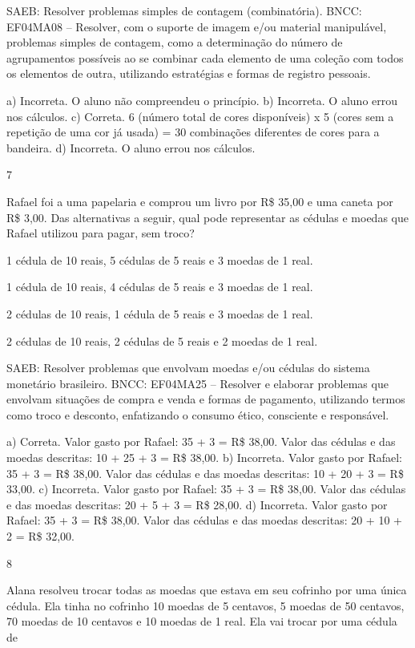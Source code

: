 \begin{mdframed}[linewidth=2pt,linecolor=salmao,roundcorner=2pt]
\begin{escolha}
{\begin{escolha}
SAEB: Resolver problemas simples de contagem (combinatória).
BNCC: EF04MA08 -- Resolver, com o suporte de imagem e/ou material manipulável, problemas simples
de contagem, como a determinação do número de agrupamentos possíveis ao se combinar cada
elemento de uma coleção com todos os elementos de outra, utilizando estratégias e formas de
registro pessoais.

a) Incorreta. O aluno não compreendeu o princípio.
b) Incorreta. O aluno errou nos cálculos.
c) Correta. 6 (número total de cores disponíveis) x 5 (cores sem a repetição de uma cor já usada) = 30 combinações diferentes de cores para a bandeira.
d) Incorreta. O aluno errou nos cálculos.

\num{7}

Rafael foi a uma papelaria e comprou um livro por R\$ 35,00 e uma caneta
por R\$ 3,00. Das alternativas a seguir, qual pode representar as cédulas
e moedas que Rafael utilizou para pagar, sem troco?

\begin{escolha}
\item
  1 cédula de 10 reais, 5 cédulas de 5 reais e 3 moedas de 1 real.
\item
  1 cédula de 10 reais, 4 cédulas de 5 reais e 3 moedas de 1 real.
\item
  2 cédulas de 10 reais, 1 cédula de 5 reais e 3 moedas de 1 real.
\item
  2 cédulas de 10 reais, 2 cédulas de 5 reais e 2 moedas de 1 real.
\end{escolha}

SAEB: Resolver problemas que envolvam moedas e/ou cédulas do
sistema monetário brasileiro.
BNCC: EF04MA25 -- Resolver e elaborar problemas que envolvam situações de compra e venda e formas
de pagamento, utilizando termos como troco e desconto, enfatizando o consumo ético, consciente e
responsável.

a) Correta. Valor gasto por Rafael: 35 + 3 = R\$ 38,00. Valor das cédulas e das moedas descritas: 10 + 25 + 3 = R\$ 38,00.
b) Incorreta. Valor gasto por Rafael: 35 + 3 = R\$ 38,00. Valor das cédulas e das moedas descritas: 10 + 20 + 3 = R\$ 33,00.
c) Incorreta. Valor gasto por Rafael: 35 + 3 = R\$ 38,00. Valor das cédulas e das moedas descritas: 20 + 5 + 3 = R\$ 28,00.
d) Incorreta. Valor gasto por Rafael: 35 + 3 = R\$ 38,00. Valor das cédulas e das moedas descritas: 20 + 10 + 2 = R\$ 32,00.

\num{8}

Alana resolveu trocar todas as moedas que estava em seu cofrinho por uma
única cédula. Ela tinha no cofrinho 10 moedas de 5 centavos, 5 moedas de
50 centavos, 70 moedas de 10 centavos e 10 moedas de 1 real. Ela vai trocar por uma cédula de


\end{escolha}}
\end{escolha}
\end{mdframed}
